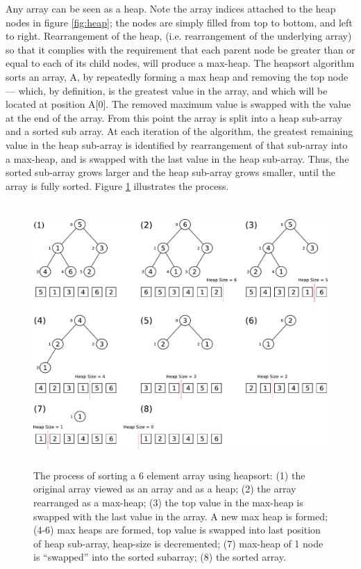 \documentclass[12pt, a4paper]{article}
\begin{document}
Any array can be seen as a heap. Note the array indices attached to the heap nodes in figure \ref{fig:heap}; the nodes are simply filled from top to bottom, and left to right. Rearrangement of the heap, (i.e. rearrangement of the underlying array) so that it complies with the requirement that each parent node be greater than or equal to each of its child nodes, will produce a max-heap. The heapsort algorithm sorts an array, A, by repeatedly forming a max heap and removing the top node — which, by definition, is the greatest value in the array, and which will be located at position A[0]. The removed maximum value is swapped with the value at the end of the array. From this point the array is split into a heap sub-array and a sorted sub array. At each iteration of the algorithm, the greatest remaining value in the heap sub-array is identified by rearrangement of that sub-array into a max-heap, and is swapped with the last value in the heap sub-array. Thus, the sorted sub-array grows larger and the heap sub-array grows smaller, until the array is fully sorted. Figure \ref{fig:heapsort} illustrates the process.

\begin{figure}[H]
    \centering
    \includegraphics[height=10cm]{heap_sort2.pdf}
    \caption{\label{fig:heapsort}The process of sorting a 6 element array using heapsort: (1) the original array viewed as an array and as a heap; (2) the array rearranged as a max-heap; (3) the top value in the max-heap is swapped with the last value in the array. A new max heap is formed; (4-6) max heaps are formed, top value is swapped into last position of heap sub-array, heap-size is decremented; (7) max-heap of 1 node is   ``swapped'' into the sorted subarray; (8) the sorted array.}
\end{figure}
\end{document}

